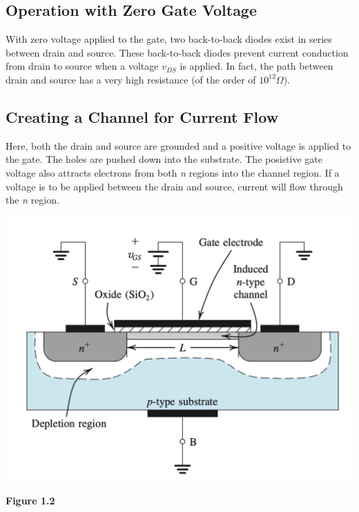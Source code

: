 \documentclass[12pt]{article}
\begin{document}
    \subsection*{Operation with Zero Gate Voltage}

    With zero voltage applied to the gate, two back-to-back diodes exist 
    in series between drain and source. These back-to-back diodes prevent 
    current conduction from drain to source when a voltage $v_{DS}$ is applied. 
    In fact, the path between drain and source has a very high resistance 
    (of the order of $10^{12} \Omega$).

    \subsection*{Creating a Channel for Current Flow}

    Here, both the drain and source are grounded and a positive voltage 
    is applied to the gate. The holes are pushed down into the substrate. The
    posistive gate voltage also attracts electrons from both \textit{n} 
    regions into the channel region. If a voltage is to be applied between 
    the drain and source, current will flow through the \textit{n} region.
    
    \begin{center}
        \centerline{\includegraphics[scale=0.5]{figures/mosfet_induced.png}}
        \textbf{Figure 1.2}
    \end{center}
\end{document}

